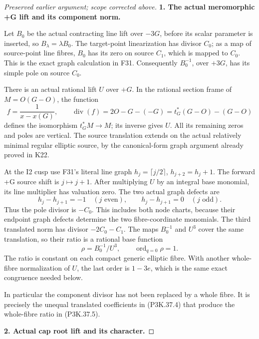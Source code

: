 \begin{proof}[Preserved earlier argument; scope corrected above]
\par\medskip\noindent\textbf{1. The actual meromorphic +G lift and its component norm.}\enspace

Let \(B_0\) be the actual contracting line lift over \(-3G\), before
its scalar parameter is inserted, so \(B_\lambda=\lambda B_0\).
The target-point linearization has divisor \(C_0\); as a map of
source-point line fibres, \(B_0\) has its zero on source \(C_1\),
which is mapped to \(C_0\). This is the exact graph calculation in F31.
Consequently \(B_0^{-1}\), over \(+3G\), has its simple pole on
source \(C_0\).

There is an actual rational lift \(U\) over \(+G\). In the rational
section frame of \(M=O(G-O)\), the function
\[
 f=\frac1{x-x(G)},\qquad
 \operatorname{div}(f)=2O-G-(-G)
       =t_G^*(G-O)-(G-O)
\]
defines the isomorphism \(t_G^*M\to M\); its inverse gives \(U\).
All its remaining zeros and poles are vertical. The source translation
extends on the actual relatively minimal regular elliptic source, by the
canonical-form graph argument already proved in K22.

At the I2 cusp use F31's literal line graph
\(h_j=\lceil j/2\rceil\), \(h_{j+2}=h_j+1\).
The forward +G source shift is \(j\mapsto j+1\). After multiplying
\(U\) by an integral base monomial, its line multiplier has valuation
zero. The two actual graph defects are
\[
 h_j-h_{j+1}=-1\quad(j\text{ even}),\qquad
 h_j-h_{j+1}=0\quad(j\text{ odd}).                              \tag{P3K.37.4}
\]
Thus the pole divisor is \(-C_0\). This includes both node charts,
because their endpoint graph defects determine the two fibre-coordinate
monomials. The third translated norm has divisor \(-2C_0-C_1\).
The maps \(B_0^{-1}\) and \(U^3\) cover the same translation,
so their ratio is a rational base function
\[
 \rho=B_0^{-1}/U^3,\qquad \operatorname{ord}_{q=0}\rho=1.         \tag{P3K.37.5}
\]
The ratio is constant on each compact generic elliptic fibre. With another
whole-fibre normalization of \(U\), the last order is \(1-3e\),
which is the same exact congruence needed below.

In particular the component divisor has not been replaced by a whole fibre.
It is precisely the unequal translated coefficients in (P3K.37.4) that produce
the whole-fibre ratio in (P3K.37.5).

\par\medskip\noindent\textbf{2. Actual cap root lift and its character.}\enspace


\end{proof}

